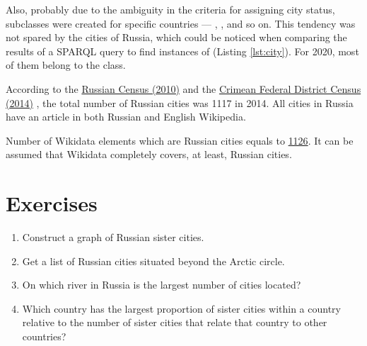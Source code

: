 Also, probably due to the ambiguity in the criteria for assigning city status, subclasses were created for specific countries — , ,  and so on. This tendency was not spared by the cities of Russia, which could be noticed when comparing the results of a SPARQL query to find instances of   (Listing \ref{lst:city}). For 2020, most of them belong to the  class.

According to the \href{http://www.gks.ru/free\_doc/new\_site/perepis2010/croc/Documents/Vol1/pub-01-03.pdf}{Russian Census (2010)}  and the \href{https://rosstat.gov.ru/free\_doc/new\_site/population/demo/perepis\_krim/KRUM\_2015.pdf}{Crimean Federal District Census (2014)} , the total number of Russian cities was \num{1117} in 2014. All cities in Russia have an article in both Russian and English Wikipedia.

Number of Wikidata elements which are Russian cities equals to \href{https://w.wiki/ngM}{\num{1126}}. It can be assumed that Wikidata completely covers, at least, Russian cities.

\section{Exercises}
\begin{enumerate}
\item Construct a graph of Russian sister cities.
\item Get a list of Russian cities situated beyond the Arctic circle.
\item On which river in Russia is the largest number of cities located?
\item Which country has the largest proportion of sister cities within a country relative to the number of sister cities that relate that country to other countries?
\end{enumerate}
